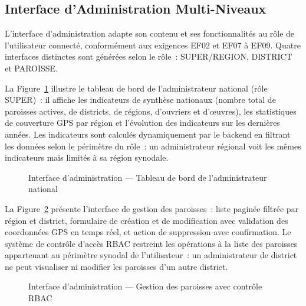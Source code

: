 \subsection{Interface d'Administration Multi-Niveaux}
\label{ssec:res-admin}

L'interface d'administration adapte son contenu et ses fonctionnalités au
rôle de l'utilisateur connecté, conformément aux exigences EF02 et EF07 à
EF09. Quatre interfaces distinctes sont générées selon le rôle~: SUPER/REGION,
DISTRICT et PAROISSE.

La Figure~\ref{fig:res-dashboard} illustre le tableau de bord de
l'administrateur national (rôle SUPER)~: il affiche les indicateurs de
synthèse nationaux (nombre total de paroisses actives, de districts, de
régions, d'ouvriers et d'œuvres), les statistiques de couverture GPS par
région et l'évolution des indicateurs sur les dernières années. Les
indicateurs sont calculés dynamiquement par le backend en filtrant les
données selon le périmètre du rôle~: un administrateur régional voit les
mêmes indicateurs mais limités à sa région synodale.

\begin{figure}[H]
  \centering
  \caption{Interface d'administration --- Tableau de bord de l'administrateur national}
  \label{fig:res-dashboard}
\end{figure}

La Figure~\ref{fig:res-paroisses} présente l'interface de gestion des
paroisses~: liste paginée filtrée par région et district, formulaire de
création et de modification avec validation des coordonnées GPS en temps
réel, et action de suppression avec confirmation. Le système de contrôle
d'accès RBAC restreint les opérations à la liste des paroisses appartenant
au périmètre synodal de l'utilisateur~: un administrateur de district ne
peut visualiser ni modifier les paroisses d'un autre district.

\begin{figure}[H]
  \centering
  \caption{Interface d'administration --- Gestion des paroisses avec contrôle RBAC}
  \label{fig:res-paroisses}
\end{figure}

